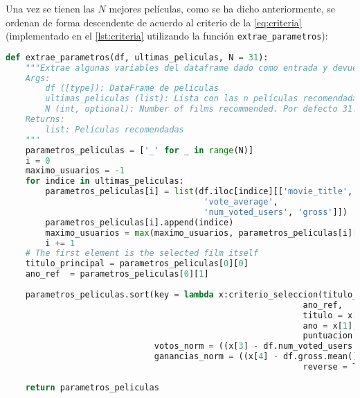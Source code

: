 Una vez se tienen las $N$ mejores películas, como se ha dicho anteriormente, se ordenan de forma descendente de acuerdo al criterio de la \autoref{eq:criteria} (implementado en el \autoref{lst:criteria} utilizando la función \texttt{extrae\_parametros}):

\begin{lstlisting}[language=Python, caption={Extrae algunas variables del dataframe dado como entrada y devuelve la lista de N películas. Esta lista se ordena de acuerdo al criterio de la función criterio\_seleccion, definida en el \autoref{lst:criteria}}]
def extrae_parametros(df, ultimas_peliculas, N = 31):
    """Extrae algunas variables del dataframe dado como entrada y devuelve la lista de N películas. Esta lista se ordena de acuerdo al criterio de la función criterio_seleccion.
    Args:
        df ([type]): DataFrame de películas
        ultimas_peliculas (list): Lista con las n películas recomendadas
        N (int, optional): Number of films recommended. Por defecto 31.
    Returns:
        list: Películas recomendadas
    """
    parametros_peliculas = ['_' for _ in range(N)]
    i = 0
    maximo_usuarios = -1
    for indice in ultimas_peliculas:
        parametros_peliculas[i] = list(df.iloc[indice][['movie_title', 'title_year',
                                        'vote_average', 
                                        'num_voted_users', 'gross']])
        parametros_peliculas[i].append(indice)
        maximo_usuarios = max(maximo_usuarios, parametros_peliculas[i][4] )
        i += 1
    # The first element is the selected film itself
    titulo_principal = parametros_peliculas[0][0]
    ano_ref  = parametros_peliculas[0][1]
    
    parametros_peliculas.sort(key = lambda x:criterio_seleccion(titulo_principal,
                                                            ano_ref, 
                                                            titulo = x[0], 
                                                            ano = x[1],
                                                            puntuacion = x[2],
                              votos_norm = ((x[3] - df.num_voted_users.mean())/df.num_voted_users.std()),
                              ganancias_norm = ((x[4] - df.gross.mean())/df.gross.std())),
                                                            reverse = True)
    
    return parametros_peliculas
\end{lstlisting}


